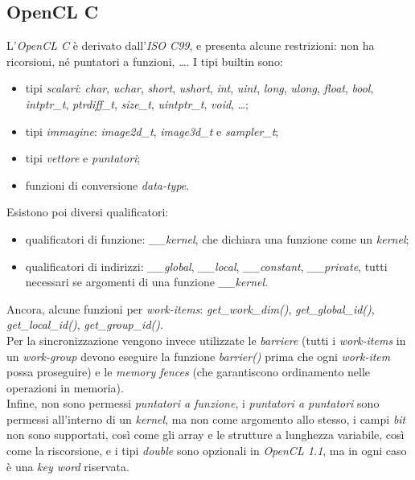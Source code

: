 \subsection{OpenCL C}
L'\textit{OpenCL C} è derivato dall'\textit{ISO C99}, e presenta alcune restrizioni: non ha ricorsioni, né puntatori a funzioni, \ldots. I tipi builtin sono:
\begin{itemize}
	\item tipi \textit{scalari}: \textit{char}, \textit{uchar}, \textit{short}, \textit{ushort}, \textit{int}, \textit{uint}, \textit{long}, \textit{ulong}, \textit{float}, \textit{bool}, \textit{intptr\_t}, \textit{ptrdiff\_t}, \textit{size\_t}, \textit{uintptr\_t}, \textit{void}, \ldots;
	\item tipi \textit{immagine}: \textit{image2d\_t}, \textit{image3d\_t} e \textit{sampler\_t};
	\item tipi \textit{vettore} e \textit{puntatori};
	\item funzioni di conversione \textit{data-type}.
\end{itemize}
Esistono poi diversi qualificatori:
\begin{itemize}
	\item qualificatori di funzione: \textit{\_\_kernel}, che dichiara una funzione come un \textit{kernel};
	\item qualificatori di indirizzi: \textit{\_\_global}, \textit{\_\_local}, \textit{\_\_constant}, \textit{\_\_private}, tutti necessari se argomenti di una funzione \textit{\_\_kernel}.
\end{itemize}
Ancora, alcune funzioni per \textit{work-items}: \textit{get\_work\_dim()}, \textit{get\_global\_id()}, \textit{get\_local\_id()}, \textit{get\_group\_id()}. \\
Per la sincronizzazione vengono invece utilizzate le \textit{barriere} (tutti i \textit{work-items} in un \textit{work-group} devono eseguire la funzione \textit{barrier()} prima che ogni \textit{work-item} possa proseguire) e le \textit{memory fences} (che garantiscono ordinamento nelle operazioni in memoria). \\
Infine, non sono permessi \textit{puntatori a funzione}, i \textit{puntatori a puntatori} sono permessi all'interno di un \textit{kernel}, ma non come argomento allo stesso, i campi \textit{bit} non sono supportati, così come gli array e le strutture a lunghezza variabile, così come la riscorsione, e i tipi \textit{double} sono opzionali in \textit{OpenCL 1.1}, ma in ogni caso è una \textit{key word} riservata.